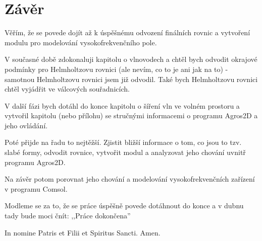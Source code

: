 \documentclass[12pt,a4paper,oneside]{article}
\numberwithin{equation}{section} %
\numberwithin{figure}{section} %
\numberwithin{table}{section} %
\begin{document}
\clearpage %
\section{Závěr}
Věřím, že se povede dojít až k úspěšnému odvození finálních rovnic a vytvoření modulu pro modelování vysokofrekvenčního pole.

V současné době zdokonaluji kapitolu o vlnovodech a chtěl bych odvodit okrajové podmínky pro Helmholtzovu rovnici (ale nevím, co to je ani jak na to) - samotnou Helmholtzovu rovnici jsem již odvodil. Také bych Helmholtzovu rovnici chtěl vyjádřit ve válcových souřadnicích.

V další fázi bych dotáhl do konce kapitolu o šíření vln ve volném prostoru a vytvořil kapitolu (nebo přílohu) se stručnými informacemi o programu Agros2D a jeho ovládání.

Poté přijde na řadu to nejtěžší. Zjistit bližší informace o tom, co jsou to tzv. slabé formy, odvodit rovnice, vytvořit modul a analyzovat jeho chování uvnitř programu Agros2D.

Na závěr potom porovnat jeho chování a modelování vysokofrekvenčních zařízení v programu Comsol.

Modleme se za to, že se práce úspěšně povede dotáhnout do konce a v dubnu tady bude moci čnít: ,,Práce dokončena''

In nomine Patris et Filii et Spiritus Sancti. Amen.
\end{document}
